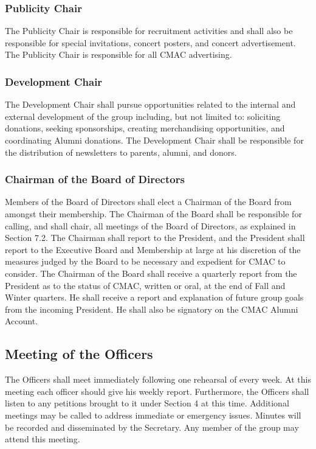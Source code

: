 \documentclass{article}
\begin{document}
\subsubsection{Publicity Chair}

The Publicity Chair is responsible for recruitment activities and
shall also be responsible for special invitations, concert posters,
and concert advertisement. The Publicity Chair is responsible for
all CMAC advertising.

\subsubsection{Development Chair}

The Development Chair shall pursue opportunities related to the internal
and external development of the group including, but not limited to:
soliciting donations, seeking sponsorships, creating merchandising
opportunities, and coordinating Alumni donations. The Development
Chair shall be responsible for the distribution of newsletters to
parents, alumni, and donors.

\subsubsection{Chairman of the Board of Directors}

Members of the Board of Directors shall elect a Chairman of the Board
from amongst their membership. The Chairman of the Board shall be
responsible for calling, and shall chair, all meetings of the Board
of Directors, as explained in Section 7.2. The Chairman shall report
to the President, and the President shall report to the Executive
Board and Membership at large at his discretion of the measures judged
by the Board to be necessary and expedient for CMAC to consider. The
Chairman of the Board shall receive a quarterly report from the President
as to the status of CMAC, written or oral, at the end of Fall and
Winter quarters. He shall receive a report and explanation of future
group goals from the incoming President. He shall also be signatory
on the CMAC Alumni Account.

\subsection{Meeting of the Officers}

The Officers shall meet immediately following one rehearsal of every
week. At this meeting each officer should give his weekly report.
Furthermore, the Officers shall listen to any petitions brought to
it under Section 4 at this time. Additional meetings may be called
to address immediate or emergency issues. Minutes will be recorded
and disseminated by the Secretary. Any member of the group may attend
this meeting.
\end{document}
